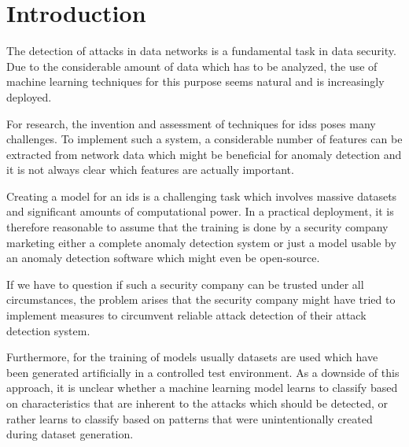\documentclass[10pt,sigconf,letterpaper,dvipsnames]{acmart}
\begin{document}

\maketitle

\section{Introduction}
The detection of attacks in data networks is a fundamental task in data security. Due to the considerable amount of data which has to be analyzed, the use of machine learning techniques for this purpose seems natural and is increasingly deployed.

For research, the invention and assessment of techniques for \glspl{ids} poses many challenges. To implement such a system, a considerable number of features can be extracted from network data which might be beneficial for anomaly detection and it is not always clear which features are actually important.

Creating a model for an \gls{ids} is a challenging task which involves massive datasets and significant amounts of computational power. In a practical deployment, it is therefore reasonable to assume that the training is done by a security company marketing either a complete anomaly detection system or just a model usable by an anomaly detection software which might even be open-source.

If we have to question if such a security company can be trusted under all circumstances, the problem arises that the security company might have tried to implement measures to circumvent reliable attack detection of their attack detection system.

Furthermore, for the training of models usually datasets are used which have been generated artificially in a controlled test environment. As a downside of this approach, it is unclear whether a machine learning model learns to classify based on characteristics that are inherent to the attacks which should be detected, or rather learns to classify based on patterns that were unintentionally created during dataset generation.
\end{document}
